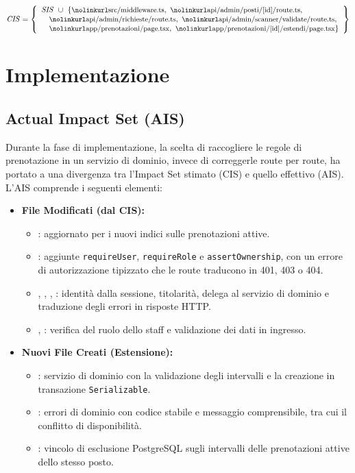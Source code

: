 \documentclass[11pt,a4paper,oneside,openany]{book}
\newcommand{\insieme}[2]{%
  \[ \mathit{#1} = \left\{ \begin{array}{l} #2 \end{array} \right\} \]}
\newcommand{\elem}[1]{\text{\file{#1}}}
\begin{document}
\insieme{CIS}{
  \mathit{SIS}\ \cup\ \{\elem{src/middleware.ts},\ \elem{api/admin/posti/[id]/route.ts},\\
  \quad \elem{api/admin/richieste/route.ts},\ \elem{api/admin/scanner/validate/route.ts},\\
  \quad \elem{app/prenotazioni/page.tsx},\ \elem{app/prenotazioni/[id]/estendi/page.tsx}\}}

\section{Implementazione}

\subsection{Actual Impact Set (AIS)}

Durante la fase di implementazione, la scelta di raccogliere le regole di
prenotazione in un servizio di dominio, invece di correggerle route per route,
ha portato a una divergenza tra l'Impact Set stimato (CIS) e quello effettivo
(AIS). L'AIS comprende i seguenti elementi:
\begin{itemize}
  \item \textbf{File Modificati (dal CIS):}
  \begin{itemize}
    \item {}: aggiornato per i nuovi indici sulle
          prenotazioni attive.
    \item {}: aggiunte \texttt{requireUser},
          \texttt{requireRole} e \texttt{assertOwnership}, con un errore di
          autorizzazione tipizzato che le route traducono in 401, 403 o 404.
    \item {},
          ,
          ,
          : identità dalla
          sessione, titolarità, delega al servizio di dominio e traduzione
          degli errori in risposte HTTP.
    \item {},
          : verifica del ruolo dello staff e
          validazione dei dati in ingresso.
  \end{itemize}
  \item \textbf{Nuovi File Creati (Estensione):}
  \begin{itemize}
    \item {}: servizio di dominio con la
          validazione degli intervalli e la creazione in transazione
          \texttt{Serializable}.
    \item {}: errori di dominio con codice
          stabile e messaggio comprensibile, tra cui il conflitto di
          disponibilità.
    \item {}:
          vincolo di esclusione PostgreSQL sugli intervalli delle prenotazioni
          attive dello stesso posto.
  \end{itemize}
\end{itemize}
\end{document}
